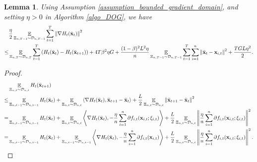 \documentclass{article}
\newtheorem{Lemma}{\bf{Lemma}}
\begin{document}
\begin{Lemma}
\label{lemma_gradient_norm_bound}
Using Assumption \ref{assumption_bounded_gradient_domain}, and setting $\eta>0$ in Algorithm \ref{algo_DOG}, we have 
\begin{align}
& \frac{\eta}{2} \mathop{\mathbb{E}}_{ \Xi_{n,T-1} \sim \mathcal{D}_{n,T-1} }\sum_{t=1}^T \left\lVert\nabla H_t(\bar{{\bf x}}_t)\right\rVert^2 \\ \nonumber
\le & \mathop{\mathbb{E}}_{ \Xi_{n,T} \sim \mathcal{D}_{n,T} } \sum_{t=1}^T  \left( H_t(\bar{{\bf x}}_t) - H_t(\bar{{\bf x}}_{t+1}) \right) + 4T\beta^2 \eta G + \frac{(1-\beta)^2L^2 \eta}{n}\mathop{\mathbb{E}}_{ \Xi_{n,T-1} \sim \mathcal{D}_{n,T-1} }\sum_{t=1}^T\sum_{i=1}^n \left\lVert \bar{{\bf x}}_t - {\bf x}_{i,t} \right\rVert^2 + \frac{TGL\eta^2}{2}.
\end{align}
\end{Lemma}
\begin{proof}

\begin{align}
\nonumber
& \mathop{\mathbb{E}}_{ \Xi_{n,t} \sim \mathcal{D}_{n,t} } H_t(\bar{{\bf x}}_{t+1}) \\ \nonumber
\le & \mathop{\mathbb{E}}_{ \Xi_{n,t-1} \sim \mathcal{D}_{n,t-1} } H_t(\bar{{\bf x}}_t) + \mathop{\mathbb{E}}_{ \Xi_{n,t} \sim \mathcal{D}_{n,t} }\left\langle\nabla H_t(\bar{{\bf x}}_t), \bar{{\bf x}}_{t+1} - \bar{{\bf x}}_t \right\rangle + \frac{L}{2}\mathop{\mathbb{E}}_{ \Xi_{n,t} \sim \mathcal{D}_{n,t} }\left\lVert\bar{{\bf x}}_{t+1} - \bar{{\bf x}}_t\right\rVert^2 \\ \nonumber
= & \mathop{\mathbb{E}}_{ \Xi_{n,t-1} \sim \mathcal{D}_{n,t-1} } H_t(\bar{{\bf x}}_t) + \mathop{\mathbb{E}}_{ \Xi_{n,t} \sim \mathcal{D}_{n,t} }\left\langle\nabla H_t(\bar{{\bf x}}_t), -\frac{\eta}{n}\sum_{i=1}^n \partial f_{i,t}({\bf x}_{i,t};\xi_{i,t}) \right\rangle + \frac{L}{2} \mathop{\mathbb{E}}_{ \Xi_{n,t} \sim \mathcal{D}_{n,t} }\left\lVert\frac{\eta}{n}\sum_{i=1}^n \partial f_{i,t}({\bf x}_{i,t};\xi_{i,t})\right\rVert^2 \\ \label{equa_lemma_gradient_norm_temp0}
= & \mathop{\mathbb{E}}_{ \Xi_{n,t-1} \sim \mathcal{D}_{n,t-1} } H_t(\bar{{\bf x}}_t) + \mathop{\mathbb{E}}_{ \Xi_{n,t-1} \sim \mathcal{D}_{n,t-1} }\left\langle\nabla H_t(\bar{{\bf x}}_t), -\frac{\eta}{n}\sum_{i=1}^n \partial f_{i,t}({\bf x}_{i,t}) \right\rangle + \frac{L}{2} \mathop{\mathbb{E}}_{ \Xi_{n,t} \sim \mathcal{D}_{n,t} }\left\lVert\frac{\eta}{n}\sum_{i=1}^n \partial f_{i,t}({\bf x}_{i,t};\xi_{i,t})\right\rVert^2.
\end{align}



\end{proof}
\end{document}
